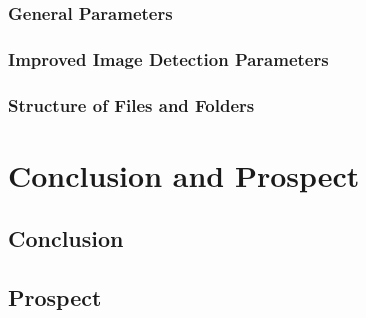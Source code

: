 \documentclass[a4paper, 11pt]{article}
\begin{document}
\subsubsection{General Parameters}
\subsubsection{Improved Image Detection Parameters}
\subsubsection{Structure of Files and Folders}

\newpage
\section{Conclusion and Prospect}
 
\subsection{Conclusion}

\subsection{Prospect}


\newpage
{}

\end{document}
